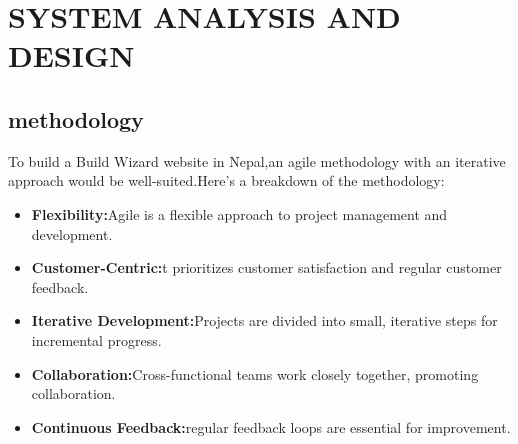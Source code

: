 \chapter{SYSTEM ANALYSIS AND DESIGN}
\section{methodology}
To build a Build Wizard website in Nepal,an agile methodology with an iterative approach would be well-suited.Here's a breakdown of the methodology:
\begin{itemize}
   \item \textbf{Flexibility:}Agile is a flexible approach to project management and development.
   \item \textbf{Customer-Centric:}t prioritizes customer satisfaction and regular customer feedback.
   \item \textbf{Iterative Development:}Projects are divided into small, iterative steps for incremental progress.
   \item \textbf{Collaboration:}Cross-functional teams work closely together, promoting collaboration.
   \item \textbf{Continuous Feedback:}regular feedback loops are essential for improvement.
\end{itemize}

